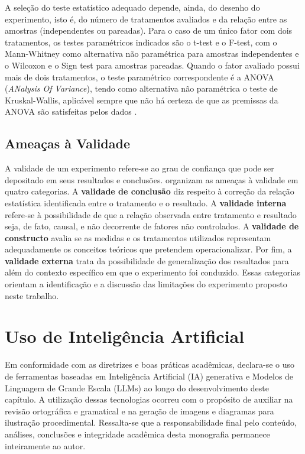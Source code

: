 A seleção do teste estatístico adequado depende, ainda, do desenho do experimento, isto é, do número de tratamentos avaliados e da relação entre as amostras (independentes ou pareadas). Para o caso de um único fator com dois tratamentos, os testes paramétricos indicados são o t-test e o F-test, com o Mann-Whitney como alternativa não paramétrica para amostras independentes e o Wilcoxon e o Sign test para amostras pareadas. Quando o fator avaliado possui mais de dois tratamentos, o teste paramétrico correspondente é a ANOVA (\textit{ANalysis Of Variance}), tendo como alternativa não paramétrica o teste de Kruskal-Wallis, aplicável sempre que não há certeza de que as premissas da ANOVA são satisfeitas pelos dados .

\subsection{Ameaças à Validade}
\label{sec:ameacas_validade_ref}

A validade de um experimento refere-se ao grau de confiança que pode ser depositado em seus resultados e conclusões.  organizam as ameaças à validade em quatro categorias. A \textbf{validade de conclusão} diz respeito à correção da relação estatística identificada entre o tratamento e o resultado. A \textbf{validade interna} refere-se à possibilidade de que a relação observada entre tratamento e resultado seja, de fato, causal, e não decorrente de fatores não controlados. A \textbf{validade de constructo} avalia se as medidas e os tratamentos utilizados representam adequadamente os conceitos teóricos que pretendem operacionalizar. Por fim, a \textbf{validade externa} trata da possibilidade de generalização dos resultados para além do contexto específico em que o experimento foi conduzido. Essas categorias orientam a identificação e a discussão das limitações do experimento proposto neste trabalho.

\section{Uso de Inteligência Artificial}

Em conformidade com as diretrizes e boas práticas acadêmicas, declara-se o uso de ferramentas baseadas em Inteligência Artificial (IA) generativa e Modelos de Linguagem de Grande Escala (LLMs) ao longo do desenvolvimento deste capítulo. A utilização dessas tecnologias ocorreu com o propósito de auxiliar na revisão ortográfica e gramatical e na geração de imagens e diagramas para ilustração procedimental. Ressalta-se que a responsabilidade final pelo conteúdo, análises, conclusões e integridade acadêmica desta monografia permanece inteiramente ao autor.